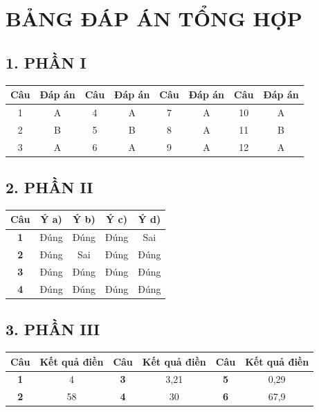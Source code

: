 \documentclass[12pt,a4paper]{article}
\begin{document}
\newpage
\section*{BẢNG ĐÁP ÁN TỔNG HỢP}

\subsection*{1. PHẦN I}
\begin{center}
\begin{tabular}{|c|c||c|c||c|c||c|c|}
\hline
\textbf{Câu} & \textbf{Đáp án} & \textbf{Câu} & \textbf{Đáp án} & \textbf{Câu} & \textbf{Đáp án} & \textbf{Câu} & \textbf{Đáp án} \\ \hline
1 & A & 4 & A & 7 & A & 10 & A \\ \hline
2 & B & 5 & B & 8 & A & 11 & B \\ \hline
3 & A & 6 & A & 9 & A & 12 & A \\ \hline
\end{tabular}
\end{center}

\subsection*{2. PHẦN II}
\begin{center}
\begin{tabular}{|c|c|c|c|c|}
\hline
\textbf{Câu} & \textbf{Ý a)} & \textbf{Ý b)} & \textbf{Ý c)} & \textbf{Ý d)} \\ \hline
\textbf{1} & Đúng & Đúng & Đúng & Sai \\ \hline
\textbf{2} & Đúng & Sai & Đúng & Đúng \\ \hline
\textbf{3} & Đúng & Đúng & Đúng & Đúng \\ \hline
\textbf{4} & Đúng & Đúng & Đúng & Đúng \\ \hline
\end{tabular}
\end{center}

\subsection*{3. PHẦN III}
\begin{center}
\begin{tabular}{|c|c||c|c||c|c|}
\hline
\textbf{Câu} & \textbf{Kết quả điền} & \textbf{Câu} & \textbf{Kết quả điền} & \textbf{Câu} & \textbf{Kết quả điền} \\ \hline
\textbf{1} & 4 & \textbf{3} & 3,21 & \textbf{5} & 0,29 \\ \hline
\textbf{2} & 58 & \textbf{4} & 30 & \textbf{6} & 67,9 \\ \hline
\end{tabular}
\end{center}
\end{document}
